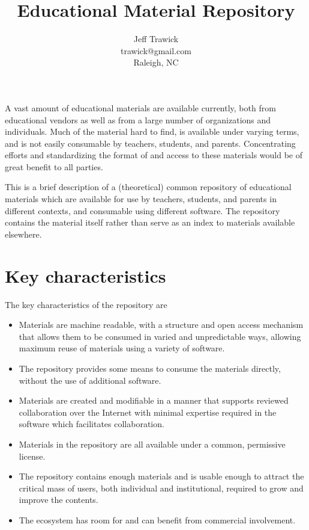 
\title{Educational Material Repository}
\author{Jeff Trawick\\trawick@gmail.com\\Raleigh, NC}
\maketitle
A vast amount of educational materials are available currently, both from
educational vendors as well as from a large number of
organizations and individuals.  Much of the material hard to find,
is available under varying terms, and is not easily consumable by teachers,
students, and parents.  Concentrating efforts and standardizing the format
of and access to these materials would be of great benefit to all parties.

This is a brief description of a (theoretical) common repository of educational
materials which are available for use by teachers, students, and parents in 
different contexts, and consumable using different software.  The repository contains
the material itself rather than serve as an index to materials available elsewhere.

\section*{Key characteristics}

The key characteristics of the repository are

\begin{itemize}
\item Materials are machine readable, with a structure and open access mechanism
that allows them to be consumed in varied and unpredictable ways, allowing
maximum reuse of materials using a variety of software.
\item The repository provides some means to consume the materials directly,
without the use of additional software.
\item Materials are created and modifiable in a manner that supports reviewed
collaboration over the Internet with minimal expertise required in the software
which facilitates collaboration.
\item Materials in the repository are all available under a common, permissive
license.
\item The repository contains enough materials and is usable enough to attract
the critical mass of users, both individual and institutional, required to 
grow and improve the contents.
\item The ecosystem has room for and can benefit from commercial involvement.
\end{itemize}

